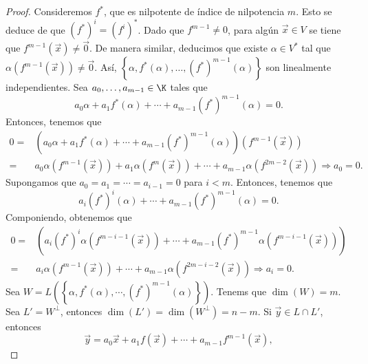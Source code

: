 \begin{proof}
	Consideremos $\displaystyle f^{*} $, que es nilpotente de índice de nilpotencia $\displaystyle m $. Esto se deduce de que $\displaystyle \left(f^{*}\right)^{i} = \left(f^{i}\right)^{*} $. Dado que $\displaystyle f^{m -1} \neq 0 $, para algún $\displaystyle \vec{x} \in V $ se tiene que $\displaystyle f^{ m -1}\left(\vec{x}\right) \neq \vec{0} $. De manera similar, deducimos que existe $\displaystyle \alpha \in V^{*} $ tal que $\displaystyle \alpha\left(f^{m -1}\left(\vec{x}\right)\right) \neq \vec{0} $. Así, $\displaystyle \left\{ \alpha, f^{*}\left(\alpha \right), \ldots, \left(f^{*}\right)^{m-1}\left(\alpha\right)\right\}  $ son linealmente independientes.
Sea $\displaystyle a_{0}, \ldots, a_{m -1} \in \K $ tales que
\[a_{0}\alpha + a_{1}f^{*}\left(\alpha \right) +\cdots+a_{m -1}\left(f^{*}\right)^{m -1}\left(\alpha \right) = 0 .\]
Entonces, tenemos que 
\[
\begin{split}
	0 =&  \left(a_{0}\alpha + a_{1}f^{*}\left(\alpha \right) +\cdots+a_{m -1}\left(f^{*}\right)^{m -1}\left(\alpha \right)\right)\left(f^{m -1}\left(\vec{x}\right)\right) \\
 = &  a_{0} \alpha\left(f^{m -1}\left(\vec{x}\right)\right) + a_{1}\alpha\left(f^{m}\left(\vec{x}\right)\right) + \cdots + a_{m -1}\alpha\left(f^{2m -2}\left(\vec{x}\right)\right) \Rightarrow a_{0} = 0.
\end{split}
\]
Supongamos que $\displaystyle a_{0} = a_{1} = \cdots = a_{i-1} = 0 $ para $\displaystyle i < m $. Entonces, tenemos que 
\[ a_{i}\left(f^{*}\right)^{i}\left(\alpha \right) + \cdots + a_{m -1}\left(f^{*}\right)^{m -1}\left(\alpha \right)= 0 .\]
Componiendo, obtenemos que
\[
\begin{split}
	0 =& \left(a_{i}\left(f^{*}\right)^{i}\alpha \left(f^{m - i-1}\left(\vec{x}\right)\right) + \cdots + a_{m -1}\left(f^{*}\right)^{ m -1}\alpha \left(f^{m -i -1}\left(\vec{x}\right)\right)\right) \\
= & a_{i}\alpha\left(f^{m -1}\left(\vec{x}\right)\right) + \cdots + a_{m -1}\alpha \left(f^{2m - i -2}\left(\vec{x}\right)\right) \Rightarrow a_{i} = 0.
\end{split}
\]
Sea $\displaystyle W = L\left( \left\{ \alpha, f^{*}\left(\alpha\right), \cdots , \left(f^{*}\right)^{m -1}\left(\alpha \right)\right\} \right) $. Tenems que $\displaystyle \dim\left(W\right) = m $. Sea $\displaystyle L' = W^{\perp } $, entonces $\displaystyle \dim\left(L'\right) = \dim\left(W^{\perp }\right) = n - m $. Si $\displaystyle \vec{y} \in L \cap L' $, entonces
\[\vec{y} = a_{0}\vec{x} + a_{1}f\left(\vec{x}\right) + \cdots + a_{m -1}f^{m -1}\left(\vec{x}\right) ,\]

\end{proof}
